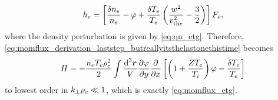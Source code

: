 \documentclass{jpp}
\newcommand{\phinorm}{\varphi}
\begin{document}
\begin{equation}
	h_e = \left[\frac{\delta n_e}{n_{e}} - \phinorm + \frac{\delta T_e}{T_{e}} \left(\frac{w^2}{\vthe^2} - \frac{3}{2}\right)\right] \Fe,
	\label{eq:he_expression}
\end{equation}
where the density perturbation is given by \cref{eq:qn_etg}. Therefore, \cref{eq:momflux_derivation_laststep_butreallyitsthelastonethistime} becomes
\begin{equation}
	\Pi =-\frac{n_{e} T_{e} \rhoe^2}{2} \int \frac{\rmd^3 \vec{r}}{V} \frac{\partial \phinorm}{\partial y} \frac{\partial}{\partial x} \left[\left(1 + \frac{Z T_{e}}{T_{i}}\right) \phinorm - \frac{\delta T_e}{T_{e}}\right]
\end{equation}
to lowest order in \(k_\perp \rho_e \ll 1\), which is exactly \cref{eq:momflux_etg}.



    
	
\end{document}

